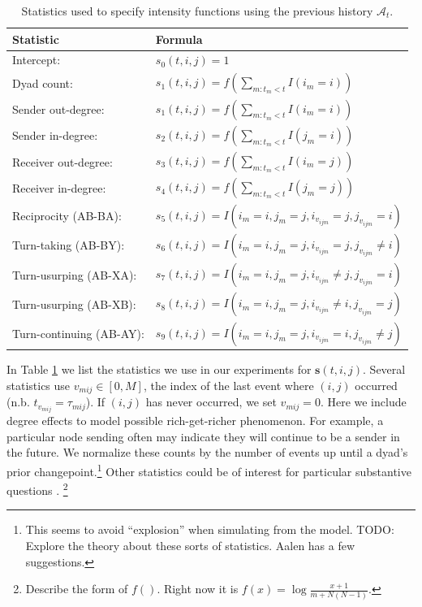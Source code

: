 \documentclass[11pt]{article}
\begin{document}
\begin{table}[t]
\footnotesize
\center
\begin{tabular}{|l|l|}
\hline
Statistic & Formula \\
\hline
\hline
Intercept:& $s_{0}(t,i,j) = 1$\\
Dyad count:& $s_{1}(t,i,j) = f(\sum_{m:t_m<t} I(i_m=i) )$\\
Sender out-degree:& $s_{1}(t,i,j) = f(\sum_{m:t_m<t} I(i_m=i) )$\\
Sender in-degree:& $s_{2}(t,i,j) = f(\sum_{m:t_m<t} I(j_m=i) )$\\
Receiver out-degree:& $s_{3}(t,i,j) = f(\sum_{m:t_m<t} I(i_m=j))$\\
Receiver in-degree:& $s_{4}(t,i,j) = f(\sum_{m:t_m<t} I(j_m=j))$\\
Reciprocity (AB-BA):& $s_{5}(t,i,j) = I(i_m=i,j_m=j,i_{v_{ijm}}=j,j_{v_{ijm}}=i)$\\
Turn-taking (AB-BY): &$s_{6}(t,i,j) = I(i_m=i,j_m=j,i_{v_{ijm}}=j,j_{v_{ijm}}\ne i)$\\
Turn-usurping (AB-XA):& $s_{7}(t,i,j) = I(i_m=i,j_m=j,i_{v_{ijm}} \ne j,j_{v_{ijm}}=i)$\\
Turn-usurping (AB-XB): &$s_{8}(t,i,j) = I(i_m=i,j_m=j,i_{v_{ijm}} \ne i,j_{v_{ijm}}=j)$\\
Turn-continuing (AB-AY):& $s_{9}(t,i,j) =  I(i_m=i,j_m=j,i_{v_{ijm}}=i,j_{v_{ijm}}\ne j)$\\
\hline
\end{tabular}
\label{tab:stats}
\caption{Statistics used to specify intensity functions using the previous history $\mathcal{A}_t$.}
\end{table}



In Table \ref{tab:stats} we list the statistics we use in our experiments for  $\mathbf{s}(t,i,j)$.  Several statistics use $v_{mij} \in [0,M]$, the index of the last event where $(i,j)$ occurred (n.b. $t_{v_{mij}} = \tau_{mij}$). If $(i,j)$ has never occurred, we set $v_{mij}=0$.  Here we include degree effects to model possible rich-get-richer phenomenon.  For example, a particular node sending often may indicate they will continue to be a sender in the future.  We normalize these counts by the number of events up until a dyad's prior changepoint.\footnote{This seems to avoid ``explosion'' when simulating from the model.  TODO: Explore the theory about these sorts of statistics.  Aalen has a few suggestions.} Other statistics could be of interest for particular substantive questions \cite{Butts2008,Vu2011}.  \footnote{Describe the form of $f()$.  Right now it is $f(x) = \log \frac{x+1}{m + N(N-1)}$.}
\end{document}
